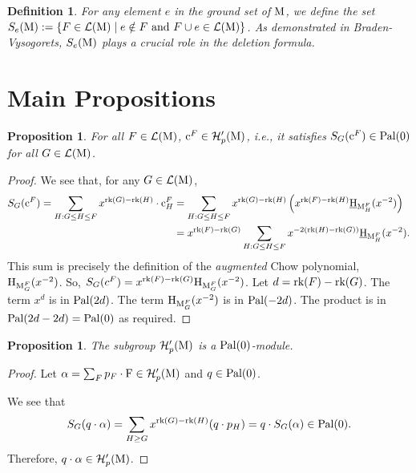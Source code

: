 \documentclass[11pt]{article}
\newcommand{\calH}{\mathcal{H}}
\newcommand{\chow}{\normalfont\text{\underline{H}}}
\newcommand{\augchow}{\normalfont\text{H}}
\newcommand{\rank}{\normalfont\text{rk}}
\newcommand{\M}{\normalfont\text{M}}
\newcommand{\Ebasis}[1]{\mathrm{#1}}
\newcommand{\Cbasis}[1]{\mathrm{c}^{#1}}
\newcommand{\CbasisSub}[2]{\mathrm{c}^{#1}_{#2}}
\newcommand{\pal}{\normalfont\text{Pal}}
\newtheorem{proposition}[theorem]{Proposition}
\newtheorem{definition}[theorem]{Definition}
\theoremstyle{remark}
\begin{document}
\begin{definition}
    For any element \(e\) in the ground set of \(\M\), we define the set
    \(S_e(\M) := \{ F \in \mathcal{L}(\M) \mid e \notin F \text{ and } F\cup e \in \mathcal{L}(\M) \}\).
    As demonstrated in Braden-Vysogorets, \(S_e(\M)\) plays a crucial role in the deletion formula.
\end{definition}

\section{Main Propositions}

\begin{proposition}\label{prop:cinHp}
    For all \(F \in \mathcal{L}(\M)\), \(\Cbasis{F} \in \calH'_p(\M)\), i.e.,
    it satisfies \(S_G(\Cbasis{F}) \in \pal(0)\) for all \(G \in \mathcal{L}(\M)\).
\end{proposition}
\begin{proof}
    We see that, for any \(G \in \mathcal{L}(\M)\),
    \begin{align*}
        S_G(\Cbasis{F}) = \sum_{H: G \le H \le F} x^{\rank(G)-\rank(H)}\cdot\CbasisSub{F}{H}
         & = \sum_{H: G \le H \le F} x^{\rank(G)-\rank(H)} \left( x^{\rank(F)-\rank(H)} \chow_{\M_H^F}(x^{-2}) \right) \\
         & = x^{\rank(F)-\rank(G)} \sum_{H: G \le H \le F} x^{-2(\rank(H) -\rank(G))} \chow_{\M_H^F}(x^{-2}).
    \end{align*}
    This sum is precisely the definition of the \textit{augmented} Chow polynomial, \(\augchow_{\M_G^F}(x^{-2})\). So,
    \(S_G(c^F) = x^{\rank(F)-\rank(G)} \augchow_{\M_G^F}(x^{-2})\). Let \(d = \rank(F)-\rank(G)\).
    The term \(x^d\) is in \(\pal(2d)\).
    The term \(\augchow_{\M_G^F}(x^{-2})\) is in \(\pal(-2d)\).
    The product is in \(\pal(2d - 2d) = \pal(0)\) as required.
\end{proof}
\begin{proposition}\label{prop:Hp_is_pal0_mod}
    The subgroup \(\calH'_p(\M)\) is a \(\pal(0)\)-module.
\end{proposition}
\begin{proof}
    Let \(\alpha = \sum_F p_F \cdot \Ebasis{F} \in \calH'_p(\M)\) and \(q \in \pal(0)\).

    We see that
    \[ S_G(q \cdot \alpha) = \sum_{H \ge G} x^{\rank(G)-\rank(H)} (q \cdot p_H)
        = q \cdot S_G(\alpha) \in \pal(0). \]
    Therefore, \(q \cdot \alpha \in \calH'_p(\M)\).
\end{proof}
\end{document}

